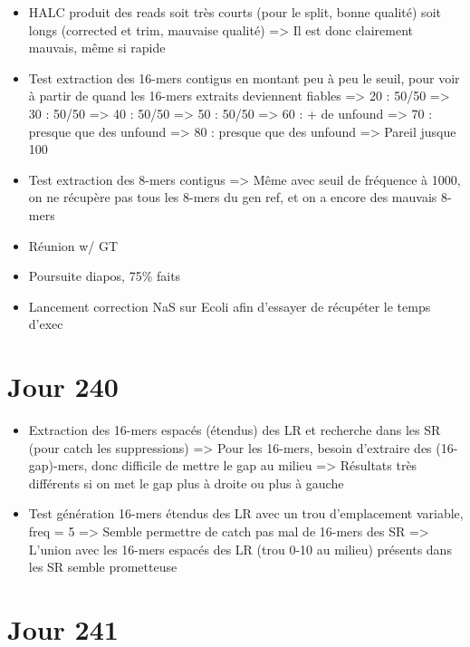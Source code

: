 \documentclass[12pt]{report}
\begin{document}
\begin{itemize}
	\item HALC produit des reads soit très courts (pour le split, bonne qualité) soit longs (corrected et trim, mauvaise qualité)
		  => Il est donc clairement mauvais, même si rapide
		  
	\item Test extraction des 16-mers contigus en montant peu à peu le seuil, pour voir à partir de quand
		  les 16-mers extraits deviennent fiables
		  => 20 : 50/50
		  => 30 : 50/50
		  => 40 : 50/50
		  => 50 : 50/50
		  => 60 : + de unfound
		  => 70 : presque que des unfound
		  => 80 : presque que des unfound
		  => Pareil jusque 100
		  
	\item Test extraction des 8-mers contigus => Même avec seuil de fréquence à 1000, on ne récupère pas
		  tous les 8-mers du gen ref, et on a encore des mauvais 8-mers
		  
	\item Réunion w/ GT
	
	\item Poursuite diapos, 75\% faits
	
	\item Lancement correction NaS sur Ecoli afin d'essayer de récupéter le temps d'exec
\end{itemize}

\section{Jour 240}

\begin{itemize}
	\item Extraction des 16-mers espacés (étendus) des LR et recherche dans les SR (pour catch les suppressions)
		  => Pour les 16-mers, besoin d'extraire des (16-gap)-mers, donc difficile de mettre le gap au milieu
		  => Résultats très différents si on met le gap plus à droite ou plus à gauche
		  
	\item Test génération 16-mers étendus des LR avec un trou d'emplacement variable, freq = 5
		  => Semble permettre de catch pas mal de 16-mers des SR
		  => L'union avec les 16-mers espacés des LR (trou 0-10 au milieu) présents dans les SR semble prometteuse
\end{itemize}

\section{Jour 241}
\end{document}
